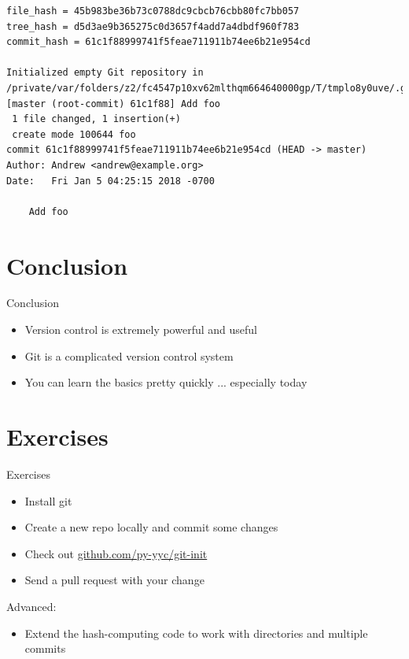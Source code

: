\documentclass[xcolor=svgnames,17pt]{beamer}
\newcommand*{\sizefont}[1]{%
    \ifcase#1\relax
    \or \tiny
    \or \scriptsize
    \or \footnotesize
    \or \small
    \or \normalsize
    \or \large
    \or \Large
    \or \LARGE
    \or \huge
    \or \Huge
    \fi}
\begin{document}
\begin{frame}[fragile]
\sizefont{2}
\begin{verbatim}
file_hash = 45b983be36b73c0788dc9cbcb76cbb80fc7bb057
tree_hash = d5d3ae9b365275c0d3657f4add7a4dbdf960f783
commit_hash = 61c1f88999741f5feae711911b74ee6b21e954cd

Initialized empty Git repository in /private/var/folders/z2/fc4547p10xv62mlthqm664640000gp/T/tmplo8y0uve/.git/
[master (root-commit) 61c1f88] Add foo
 1 file changed, 1 insertion(+)
 create mode 100644 foo
commit 61c1f88999741f5feae711911b74ee6b21e954cd (HEAD -> master)
Author: Andrew <andrew@example.org>
Date:   Fri Jan 5 04:25:15 2018 -0700

    Add foo
\end{verbatim}
\end{frame}

\section{Conclusion}

\begin{frame}{Conclusion}
\begin{itemize}
\item Version control is extremely powerful and useful
\pause
\item Git is a complicated version control system
\pause
\item You can learn the basics pretty quickly ... especially today
\end{itemize}
\end{frame}

\section{Exercises}

\begin{frame}{Exercises}
\begin{itemize}
\item Install git
\item Create a new repo locally and commit some changes
\item Check out \href{https://github.com/py-yyc/git-init}{github.com/py-yyc/git-init}
\item Send a pull request with your change
\end{itemize}
Advanced:
\begin{itemize}
\item Extend the hash-computing code to work with directories and multiple
commits
\end{itemize}
\end{frame}
\end{document}
